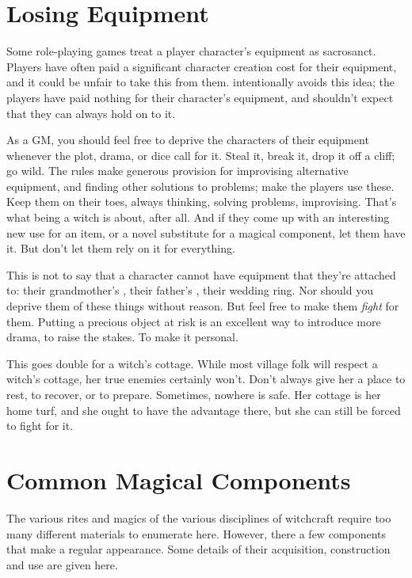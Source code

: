 \section{Losing Equipment}

Some role-playing games treat a player character's equipment as sacrosanct.
Players have often paid a significant character creation cost for their equipment, and it could be unfair to take this from them.
 intentionally avoids this idea; the players have paid nothing for their character's equipment, and shouldn't expect that they can always hold on to it.

As a GM, you should feel free to deprive the characters of their equipment whenever the plot, drama, or dice call for it.
Steal it, break it, drop it off a cliff; go wild.
The rules make generous provision for improvising alternative equipment, and finding other solutions to problems; make the players use these.
Keep them on their toes, always thinking, solving problems, improvising.
That's what being a witch is about, after all.
And if they come up with an interesting new use for an item, or a novel substitute for a magical component, let them have it.
But don't let them rely on it for everything.

This is not to say that a character cannot have equipment that they're attached to: their grandmother's , their father's , their wedding ring.
Nor should you deprive them of these things without reason.
But feel free to make them \emph{fight} for them.
Putting a precious object at risk is an excellent way to introduce more drama, to raise the stakes.
To make it personal.

This goes double for a witch's cottage.
While most village folk will respect a witch's cottage, her true enemies certainly won't.
Don't always give her a place to rest, to recover, or to prepare.
Sometimes, nowhere is safe.
Her cottage is her home turf, and she ought to have the advantage there, but she can still be forced to fight for it.



\section{Common Magical Components}

The various rites and magics of the various disciplines of witchcraft require too many different materials to enumerate here.
However, there a few components that make a regular appearance.
Some details of their acquisition, construction and use are given here.

